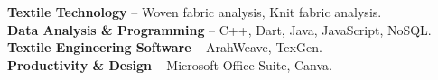 


\textbf{Textile Technology} – Woven fabric analysis, Knit fabric analysis. \\
\vspace{1mm}
\textbf{Data Analysis \& Programming} – C++, Dart, Java, JavaScript, NoSQL\@. \\
\vspace{1mm}
\textbf{Textile Engineering Software} – ArahWeave, TexGen. \\
\vspace{1mm}
\textbf{Productivity \& Design} – Microsoft Office Suite, Canva.
